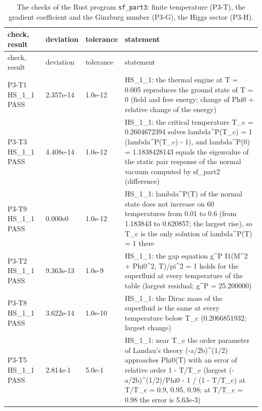 \documentclass[aps,prd,onecolumn,superscriptaddress,nofootinbib,floatfix,longbibliography]{revtex4-2}
\begin{document}
\begingroup\fontsize{7}{8.5}\selectfont\setlength{\tabcolsep}{3pt}
\begin{longtable}{p{}p{}p{}p{}}
\caption{The checks of the Rust program \texttt{sf\_part3}: finite temperature (P3-T), the gradient coefficient and the Ginzburg number (P3-G), the Higgs sector (P3-H).}\\
\hline\hline
check, result & deviation & tolerance & statement \\ \hline
\endfirsthead
\hline check, result & deviation & tolerance & statement \\ \hline
\endhead
\hline\hline
\endlastfoot
P3-T1 HS\_1\_1 \newline PASS & 2.357e-14 & 1.0e-12 & HS\_1\_1: the thermal engine at T = 0.005 reproduces the ground state of T = 0 (field and free energy; \textbar{}change of Phi0\textbar{} + relative change of the energy) \\
P3-T3 HS\_1\_1 \newline PASS & 4.408e-14 & 1.0e-12 & HS\_1\_1: the critical temperature T\_c = 0.2604672394 solves lambda\textasciicircum{}P(T\_c) = 1 (\textbar{}lambda\textasciicircum{}P(T\_c) - 1\textbar{}), and lambda\textasciicircum{}P(0) = 1.1838428143 equals the eigenvalue of the static pair response of the normal vacuum computed by sf\_part2 (difference) \\
P3-T9 HS\_1\_1 \newline PASS & 0.000e0 & 1.0e-12 & HS\_1\_1: lambda\textasciicircum{}P(T) of the normal state does not increase on 60 temperatures from 0.01 to 0.6 (from 1.183843 to 0.620857; the largest rise), so T\_c is the only solution of lambda\textasciicircum{}P(T) = 1 there \\
P3-T2 HS\_1\_1 \newline PASS & 9.363e-13 & 1.0e-9 & HS\_1\_1: the gap equation g\textasciicircum{}P I1(M\textasciicircum{}2 + Phi0\textasciicircum{}2, T)/pi\textasciicircum{}2 = 1 holds for the superfluid at every temperature of the table (largest \textbar{}residual\textbar{}; g\textasciicircum{}P = 25.200000) \\
P3-T8 HS\_1\_1 \newline PASS & 3.622e-14 & 1.0e-10 & HS\_1\_1: the Dirac mass of the superfluid is the same at every temperature below T\_c (0.2066851932; largest change) \\
P3-T5 HS\_1\_1 \newline PASS & 2.814e-1 & 5.0e-1 & HS\_1\_1: near T\_c the order parameter of Landau's theory (-a/2b)\textasciicircum{}(1/2) approaches Phi0(T) with an error of relative order 1 - T/T\_c (largest \textbar{}(-a/2b)\textasciicircum{}(1/2)/Phi0 - 1\textbar{} / (1 - T/T\_c) at T/T\_c = 0.9, 0.95, 0.98; at T/T\_c = 0.98 the error is 5.63e-3) \\

\end{longtable}
\end{document}
